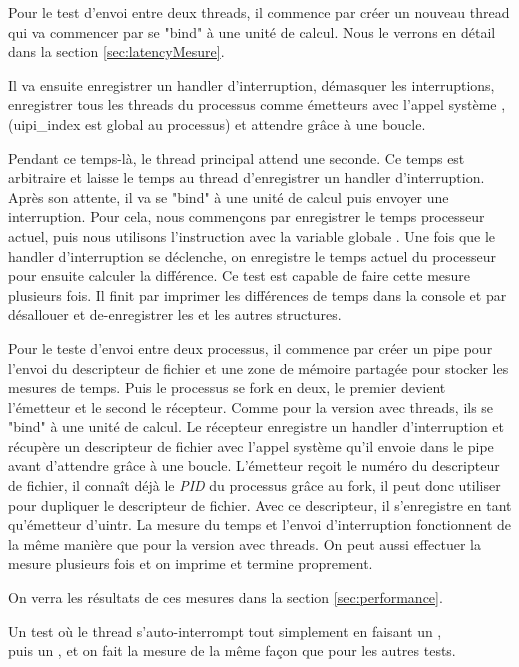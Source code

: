 Pour le test d'envoi entre deux threads, il commence par créer un nouveau thread qui va commencer par se "bind" à une unité de calcul.
Nous le verrons en détail dans la section \ref{sec:latencyMesure}.

Il va ensuite enregistrer un handler d'interruption, démasquer les interruptions, enregistrer tous les threads du processus comme émetteurs avec l'appel système ,\\
(uipi_index est global au processus) et attendre grâce à une boucle.

Pendant ce temps-là, le thread principal attend une seconde.
Ce temps est arbitraire et laisse le temps au thread d'enregistrer un handler d'interruption.
Après son attente, il va se "bind" à une unité de calcul puis envoyer une interruption.
Pour cela, nous commençons par enregistrer le temps processeur actuel, puis nous utilisons l'instruction  avec la variable globale .
Une fois que le handler d'interruption se déclenche, on enregistre le temps actuel du processeur pour ensuite calculer la différence.
Ce test est capable de faire cette mesure plusieurs fois.
Il finit par imprimer les différences de temps dans la console et par désallouer et de-enregistrer les \uintr{} et les autres structures.

Pour le teste d'envoi entre deux processus, il commence par créer un pipe pour l'envoi du descripteur de fichier et une zone de mémoire partagée pour stocker les mesures de temps.
Puis le processus se fork en deux, le premier devient l'émetteur et le second le récepteur.
Comme pour la version avec threads, ils se "bind" à une unité de calcul.
Le récepteur enregistre un handler d'interruption et récupère un descripteur de fichier avec l'appel système  qu'il envoie dans le pipe avant d'attendre grâce à une boucle.
L'émetteur reçoit le numéro du descripteur de fichier, il connaît déjà le \emph{PID} du processus grâce au fork,
il peut donc utiliser  pour dupliquer le descripteur de fichier.
Avec ce descripteur, il s'enregistre en tant qu'émetteur d'uintr.
La mesure du temps et l'envoi d'interruption fonctionnent de la même manière que pour la version avec threads.
On peut aussi effectuer la mesure plusieurs fois et on imprime et termine proprement.

On verra les résultats de ces mesures dans la section \ref{sec:performance}.

Un test où le thread s'auto-interrompt tout simplement en faisant un ,\\
puis un , et on fait la mesure de la même façon que pour les autres tests.

